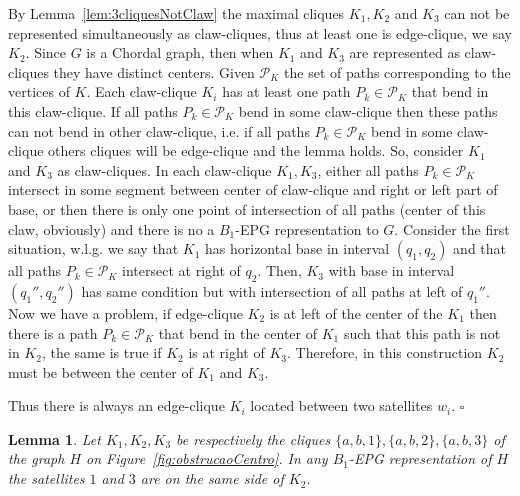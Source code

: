 \documentclass[9pt]{entcs}
\newtheorem{lema}[thm]{Lemma}%
\begin{document}
\begin{pf}
By Lemma~\ref{lem:3cliquesNotClaw} the maximal cliques $K_1, K_2$ and $K_3$ can not be represented simultaneously as claw-cliques, thus at least one is edge-clique, we say $K_2$. Since $G$ is a Chordal graph, then when $K_1$ and $K_3$ are represented as claw-cliques they have  distinct centers.
Given $\mathcal{P}_K$ the set of paths corresponding to the vertices of $K$. 
Each claw-clique $K_i$ has at least one path $P_k \in \mathcal{P}_K$ that bend in this claw-clique. If all paths $P_k \in \mathcal{P}_K$ bend in some claw-clique then these paths can not bend in other claw-clique, i.e. if all paths $P_k \in \mathcal{P}_K$ bend in some claw-clique others cliques will be edge-clique and the lemma holds. So, consider $K_1$ and $K_3$ as claw-cliques.
In each claw-clique $K_1, K_3$, either all paths $P_k \in \mathcal{P}_K$ intersect in some segment between center of claw-clique and right or left part of base, or then there is only one point of intersection of all paths (center of this claw, obviously) and there is no a $B_1$-EPG representation to $G$. Consider the first situation,  w.l.g. we say that $K_1$ has horizontal base in interval $(q_1,q_2)$ and that all paths $P_k \in \mathcal{P}_K$ intersect  at right of $q_2$. Then, $K_3$ with base in interval $(q_1'',q_2'')$ has same condition but with intersection of all paths at left of $q_1''$. Now we have a problem, if edge-clique $K_2$ is at left of the center of the $K_1$ then there is a path $P_k \in \mathcal{P}_K$ that bend in the center of $K_1$ such that this path is not in $K_2$, the same is true if $K_2$ is at right of $K_3$. %
Therefore, in this construction $K_2$ must be between the center of $K_1$ and $K_3$. 

Thus there is always an edge-clique $K_i$ located between two satellites $w_i$. $\square$
\end{pf}


\begin{lema} \label{lem:obstrucaoCentro}
Let $K_1, K_2, K_3$ be respectively the cliques $\{a,b,1\}, \{a,b,2\}, \{a,b,3\}$ of the graph $H$ on Figure~\ref{fig:obstrucaoCentro}.
In any $B_1$-EPG representation of %
$H$ the satellites $1$ and $3$
are on the same side of $K_2$.
\end{lema}
\end{document}
